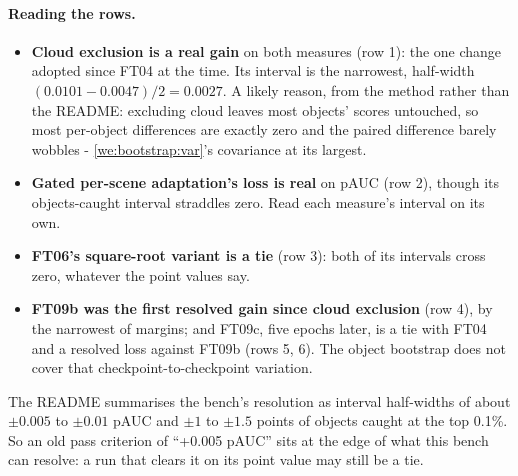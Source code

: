 \paragraph{Reading the rows.}
\begin{itemize}
\item \textbf{Cloud exclusion is a real gain} on both measures (row 1): the one change adopted since FT04 at the time.
Its interval is the narrowest, half-width $(0.0101 - 0.0047)/2 = 0.0027$. A likely reason, from the method rather than
the README: excluding cloud leaves most objects' scores untouched, so most per-object differences are exactly zero and the
paired difference barely wobbles - \cref{we:bootstrap:var}'s covariance at its largest.
\item \textbf{Gated per-scene adaptation's loss is real} on pAUC (row 2), though its objects-caught interval straddles
zero. Read each measure's interval on its own.
\item \textbf{FT06's square-root variant is a tie} (row 3): both of its intervals cross zero, whatever the point values say.
\item \textbf{FT09b was the first resolved gain since cloud exclusion} (row 4), by the narrowest of margins; and FT09c,
five epochs later, is a tie with FT04 and a resolved loss against FT09b (rows 5, 6). The object bootstrap does not cover
that checkpoint-to-checkpoint variation.
\end{itemize}

The README summarises the bench's resolution as interval half-widths of about $\pm 0.005$ to $\pm 0.01$ pAUC and $\pm 1$ to
$\pm 1.5$ points of objects caught at the top 0.1\%. So an old pass criterion of ``+0.005 pAUC'' sits at the edge of what
this bench can resolve: a run that clears it on its point value may still be a tie.

